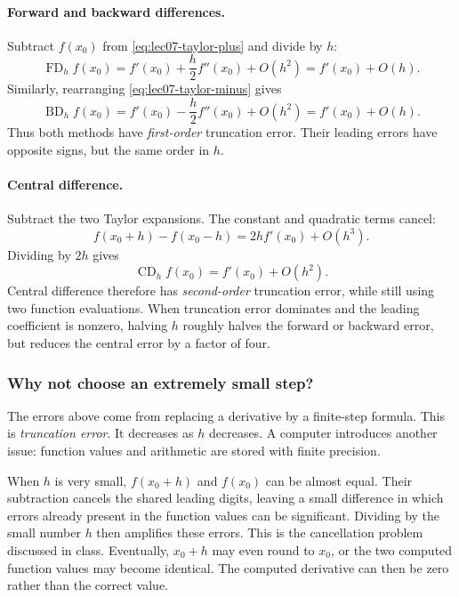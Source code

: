 \paragraph{Forward and backward differences.}
Subtract $f(x_0)$ from \autoref{eq:lec07-taylor-plus} and divide by $h$:
\begin{equation}
 \operatorname{FD}_h f(x_0)
 =f'(x_0)+\frac{h}{2}f''(x_0)+O(h^2)
 =f'(x_0)+O(h).
 \label{eq:lec07-fd-error}
\end{equation}
Similarly, rearranging \autoref{eq:lec07-taylor-minus} gives
\begin{equation}
 \operatorname{BD}_h f(x_0)
 =f'(x_0)-\frac{h}{2}f''(x_0)+O(h^2)
 =f'(x_0)+O(h).
 \label{eq:lec07-bd-error}
\end{equation}
Thus both methods have \emph{first-order} truncation error. Their leading errors have opposite signs, but the same order in $h$.

\paragraph{Central difference.}
Subtract the two Taylor expansions. The constant and quadratic terms cancel:
\[
 f(x_0+h)-f(x_0-h)=2hf'(x_0)+O(h^3).
\]
Dividing by $2h$ gives
\begin{equation}
 \operatorname{CD}_h f(x_0)=f'(x_0)+O(h^2).
 \label{eq:lec07-cd-error}
\end{equation}
Central difference therefore has \emph{second-order} truncation error, while still using two function evaluations. When truncation error dominates and the leading coefficient is nonzero, halving $h$ roughly halves the forward or backward error, but reduces the central error by a factor of four.

\subsubsection*{Why not choose an extremely small step?}
The errors above come from replacing a derivative by a finite-step formula. This is \emph{truncation error}. It decreases as $h$ decreases. A computer introduces another issue: function values and arithmetic are stored with finite precision.

When $h$ is very small, $f(x_0+h)$ and $f(x_0)$ can be almost equal. Their subtraction cancels the shared leading digits, leaving a small difference in which errors already present in the function values can be significant. Dividing by the small number $h$ then amplifies these errors. This is the cancellation problem discussed in class. Eventually, $x_0+h$ may even round to $x_0$, or the two computed function values may become identical. The computed derivative can then be zero rather than the correct value.

